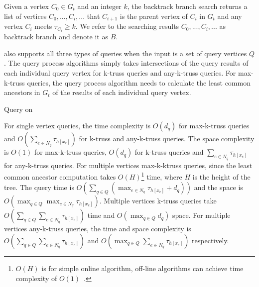\begin{Def}
Given a vertex $C_{0} \in G_t$ and an integer $k$, the backtrack branch search returns a list of vertices $C_{0},...,C_{i},...$ that $C_{i+1}$ is the parent vertex of $C_{i}$ in $G_t$ and any vertex $C_{i}$ meets $\tau_{C_{i}} \ge k$. We refer to the searching results $C_{0},...,C_{i},...$ as backtrack branch and denote it as $B$.
\label{def:backtrack_branch_search}
\end{Def}

\Treeindex{} also supports all three types of queries when the input is a set of query vertices $Q$. The query process algorithms simply takes intersections of the query results of each individual query vertex for k-truss queries and any-k-truss queries. For max-k-truss queries, the query process algorithm needs to calculate the least common ancestors in $G_t$ of the results of each individual query vertex.

\begin{algorithm}
	\BlankLine
	\BlankLine
	\BlankLine
	\caption{Query on \Treeindex{}}\label{alg:\treeindex{}_query}
\end{algorithm}

For single vertex queries, the time complexity is $O(d_q)$ for max-k-truss queries and $O(\sum_{e \in N_q}\tau_{h[x_e]})$ for k-truss and any-k-truss queries. The space complexity is $O(1)$ for max-k-truss queries, $O(d_q)$ for k-truss queries and $\sum_{e \in N_q}\tau_{h[x_e]}$ for any-k-truss queries. For multiple vertices max-k-ktruss queries, since the least common ancestor computation takes $O(H)$\footnote{$O(H)$ is for simple online algorithm, off-line algorithms can achieve time complexity of $O(1)$~\cite{bender2000lca}.} time, where $H$ is the height of the tree. The query time is $O(\sum_{q \in Q}(\max_{e \in N_q}\tau_{h[x_e]} + d_q))$ and the space is $O(\max_{q \in Q}\max_{e \in N_q}\tau_{h[x_e]})$. Multiple vertices k-truss queries take $O(\sum_{q \in Q}\sum_{e \in N_q}\tau_{h[x_e]})$ time and $O(\max_{q \in Q}d_q)$ space. For multiple vertices any-k-truss queries, the time and space complexity is $O(\sum_{q \in Q}\sum_{e \in N_q}\tau_{h[x_e]})$ and $O(\max_{q \in Q}\sum_{e \in N_q}\tau_{h[x_e]})$ respectively.

